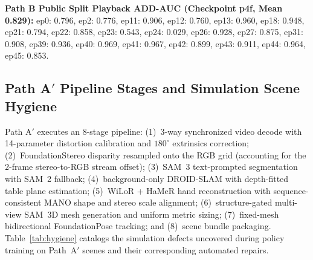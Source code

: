 \documentclass[10pt]{nvidiaextabstract}
\begin{document}
\textbf{Path B Public Split Playback ADD-AUC (Checkpoint p4f, Mean 0.829):} ep0: 0.796, ep2: 0.776, ep11: 0.906, ep12: 0.760, ep13: 0.960, ep18: 0.948, ep21: 0.794, ep22: 0.858, ep23: 0.543, ep24: 0.029, ep26: 0.928, ep27: 0.875, ep31: 0.908, ep39: 0.936, ep40: 0.969, ep41: 0.967, ep42: 0.899, ep43: 0.911, ep44: 0.964, ep45: 0.853.

\subsection{Path A$'$ Pipeline Stages and Simulation Scene Hygiene}
\label{app:patha-prime}
Path A$'$ executes an 8-stage pipeline: (1)~3-way synchronized video decode with 14-parameter distortion calibration and $180^\circ$ extrinsics correction; (2)~FoundationStereo disparity resampled onto the RGB grid (accounting for the 2-frame stereo-to-RGB stream offset); (3)~SAM~3 text-prompted segmentation with SAM~2 fallback; (4)~background-only DROID-SLAM with depth-fitted table plane estimation; (5)~WiLoR + HaMeR hand reconstruction with sequence-consistent MANO shape and stereo scale alignment; (6)~structure-gated multi-view SAM~3D mesh generation and uniform metric sizing; (7)~fixed-mesh bidirectional FoundationPose tracking; and (8)~scene bundle packaging. Table~\ref{tab:hygiene} catalogs the simulation defects uncovered during policy training on Path~A$'$ scenes and their corresponding automated repairs.
\end{document}
